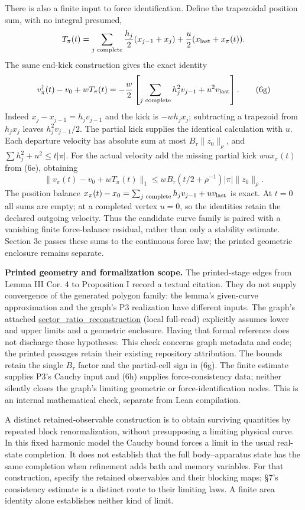 \documentclass[11pt,a4paper]{article}
\begin{document}
There is also a finite input to force identification. Define the
trapezoidal position sum, with no integral presumed,
\[T_\pi(t)=\sum_{j\text{ complete}}\frac{h_j}{2}(x_{j-1}+x_j)
             +\frac u2(x_{\rm last}+x_\pi(t)).\] The same end-kick
construction gives the exact identity \[v_\pi^\dagger(t)-v_0+wT_\pi(t)
=-\frac w2\left[\sum_{j\text{ complete}}h_j^2v_{j-1}
                       +u^2v_{\rm last}\right].\tag{6g}\] Indeed
\(x_j-x_{j-1}=h_jv_{j-1}\) and the kick is \(-wh_jx_j\); subtracting a
trapezoid from \(h_jx_j\) leaves \(h_j^2v_{j-1}/2\). The partial kick
supplies the identical calculation with \(u\). Each departure velocity
has absolute sum at most \(B_\tau\|z_0\|_\rho\), and
\(\sum h_j^2+u^2\le t|\pi|\). For the actual velocity add the missing
partial kick \(wu x_\pi(t)\) from (6e), obtaining
\[\|v_\pi(t)-v_0+wT_\pi(t)\|_1
\le wB_\tau(t/2+\rho^{-1})|\pi|\|z_0\|_\rho.
\tag{6h}\] The position balance
\(x_\pi(t)-x_0=\sum_{j\text{ complete}}h_jv_{j-1}+uv_{\rm last}\) is
exact. At \(t=0\) all sums are empty; at a completed vertex \(u=0\), so
the identities retain the declared outgoing velocity. Thus the candidate
curve family is paired with a vanishing finite force-balance residual,
rather than only a stability estimate. Section 3c passes these sums to
the continuous force law; the printed geometric enclosure remains
separate.

\textbf{Printed geometry and formalization scope.} The printed-stage
edges from Lemma III Cor. 4 to Proposition I record a textual citation.
They do not supply convergence of the generated polygon family: the
lemma's given-curve approximation and the graph's P3 realization have
different inputs. The graph's attached
\href{https://github.com/arivero/newtonlean/blob/381d5e9/NewtonLimitDynamics/Polygon/Enclosure.lean}{sector\_ratio\_reconstruction}
(local full-read) explicitly assumes lower and upper limits and a
geometric enclosure. Having that formal reference does not discharge
those hypotheses. This check concerns graph metadata and code; the
printed passages retain their existing repository attribution. The
bounds retain the single \(B_\tau\) factor and the partial-cell sign in
(6g). The finite estimate supplies P3's Cauchy input and (6h) supplies
force-consistency data; neither silently closes the graph's limiting
geometric or force-identification nodes. This is an internal
mathematical check, separate from Lean compilation.

A distinct retained-observable construction is to obtain surviving
quantities by repeated block renormalization, without presupposing a
limiting physical curve. In this fixed harmonic model the Cauchy bound
forces a limit in the usual real-state completion. It does not establish
that the full body--apparatus state has the same completion when
refinement adds bath and memory variables. For that construction,
specify the retained observables and their blocking maps; §7's
consistency estimate is a distinct route to their limiting laws. A
finite area identity alone establishes neither kind of limit.
\end{document}
